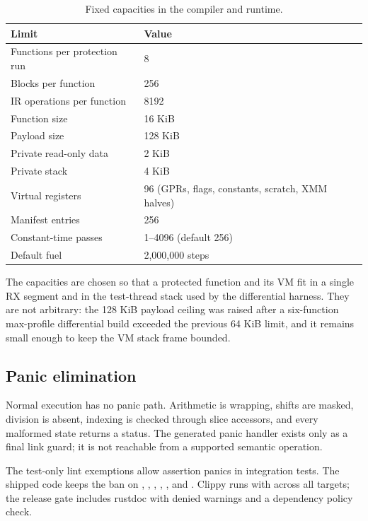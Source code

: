 \begin{table}[htbp]
\centering
\small
\caption{Fixed capacities in the compiler and runtime.}
\label{tab:limits}
\begin{tabular}{@{}ll@{}}
\toprule
Limit & Value \\
\midrule
Functions per protection run & 8 \\
Blocks per function & 256 \\
IR operations per function & 8192 \\
Function size & 16 KiB \\
Payload size & 128 KiB \\
Private read-only data & 2 KiB \\
Private stack & 4 KiB \\
Virtual registers & 96 (GPRs, flags, constants, scratch, XMM halves) \\
Manifest entries & 256 \\
Constant-time passes & 1--4096 (default 256) \\
Default fuel & 2,000,000 steps \\
\bottomrule
\end{tabular}
\end{table}

The capacities are chosen so that a protected function and its VM fit in a
single RX segment and in the test-thread stack used by the differential harness.
They are not arbitrary: the 128 KiB payload ceiling was raised after a
six-function max-profile differential build exceeded the previous 64 KiB limit,
and it remains small enough to keep the VM stack frame bounded.

\subsection{Panic elimination}

Normal execution has no panic path. Arithmetic is wrapping, shifts are masked,
division is absent, indexing is checked through slice accessors, and every
malformed state returns a status. The generated panic handler exists only as a
final  link guard; it is not reachable from a supported semantic
operation.

The test-only lint exemptions allow assertion panics in integration tests. The
shipped code keeps the ban on , , ,
, , and . Clippy runs with
 across all targets; the release gate includes rustdoc with
denied warnings and a dependency policy check.

